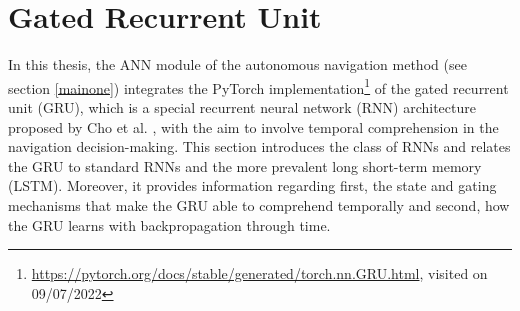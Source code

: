 \section{Gated Recurrent Unit} \label{sec:gru}
In this thesis,
the ANN module of the autonomous navigation method (see section \ref{mainone})
integrates the PyTorch implementation\footnote{
    \url{https://pytorch.org/docs/stable/generated/torch.nn.GRU.html}, visited on 09/07/2022
}
of the gated recurrent unit (GRU), 
which is a special recurrent neural network (RNN) architecture
proposed by Cho et al. \cite{Cho2014},
with the aim to involve temporal comprehension in
the navigation decision-making.
This section introduces the class of RNNs
and relates the GRU to standard RNNs
and the more prevalent long short-term memory (LSTM).
Moreover, it provides information regarding first,
the state and gating mechanisms that make the GRU able to comprehend temporally
and second, how the GRU learns with backpropagation through time.

